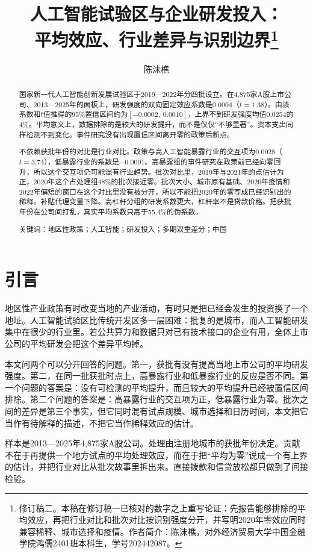 \documentclass[12pt,hyperref,a4paper,UTF8]{ctexart}
\title{\songti\bfseries\zihao{2} 人工智能试验区与企业研发投入：\\平均效应、行业差异与识别边界\thanks{修订稿二。本稿在修订稿一已核对的数字之上重写论证：先报告能够排除的平均效应，再把行业对比和批次对比按识别强度分开，并写明2020年零效应同时兼容稀释、城市选择和疫情。作者简介：陈沫樵，对外经济贸易大学中国金融学院鸿儒2401班本科生，学号202442087。}}
\author{\songti\zihao{4} 陈沫樵}
\date{}
\begin{document}
\maketitle

\begin{abstract}
国家新一代人工智能创新发展试验区于2019—2022年分四批设立。在4,875家A股上市公司、2013—2025年的面板上，研发强度的双向固定效应系数是0.0004（$t=1.38$）。由该系数和$t$值推得的95\%置信区间约为$[-0.0002,\ 0.0010]$，上界不到研发强度均值0.0254的4\%。平均意义上，数据排除的是较大的研发提升，而不是仅仅“不够显著”。资本支出同样检测不到变化。事件研究没有出现置信区间离开零的政策后断点。

不依赖获批年份的对比是行业对比。政策与高人工智能暴露行业的交互项为0.0028（$t=3.74$），低暴露行业的系数是$-0.0001$。高暴露组的事件研究在政策前已经向零回升，所以这个交互项仍可能混有行业趋势。批次对比里，2019年与2021年的点估计为正，2020年这个占处理组48\%的批次接近零。批次大小、城市原有基础、2020年疫情和2022年偏短的窗口在这个对比里没有被分开，所以不能把2020年的零写成已经识别出的稀释。补贴代理变量下降。高杠杆分组的研发系数更大，杠杆率不是贷款价格。把获批年份在公司间打乱，真实平均系数只高于55.4\%的伪系数。

{\heiti 关键词：}地区性政策；人工智能；研发投入；多期双重差分；中国
\end{abstract}

\section{引\quad 言}

地区性产业政策有时改变当地的产业活动，有时只是把已经会发生的投资换了一个地址\parencite{kline2014local,neumark2011enterprise,wang2013sez}。人工智能试验区比传统开发区多一层困难：批复的是城市，而人工智能研发集中在很少的行业里。若公共算力和数据只对已有技术接口的企业有用，全体上市公司的平均研发会把这个差异平均掉\parencite{cohen1990absorptive,bloom2019toolkit}。

本文问两个可以分开回答的问题。第一，获批有没有提高当地上市公司的平均研发强度。第二，在同一批获批时点上，高暴露行业和低暴露行业的反应是否不同。第一个问题的答案是：没有可检测的平均提升，而且较大的平均提升已经被置信区间排除。第二个问题的答案是：高暴露行业的交互项为正，低暴露行业为零。批次之间的差异是第三个事实，但它同时混有试点规模、城市选择和日历时间，本文把它当作有待解释的描述，不把它当作稀释效应的估计。

样本是2013—2025年4,875家A股公司。处理由注册地城市的获批年份决定。贡献不在于再提供一个地方试点的平均处理效应，而在于把“平均为零”说成一个有上界的估计，并把行业对比从批次故事里拆出来。直接拨款和信贷放松都只做到了间接检验。
\end{document}
